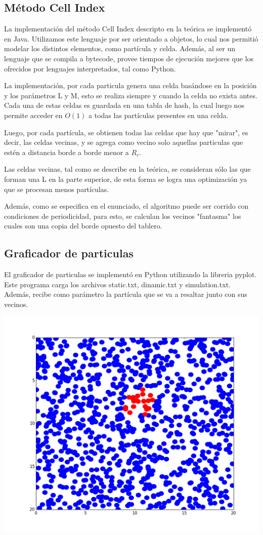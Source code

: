 \documentclass[a4paper]{article}
\begin{document}
\subsection{Método Cell Index}
La implementación del método Cell Index descripto en la teórica se implementó en Java. Utilizamos este lenguaje por ser orientado a objetos, lo cual nos permitió modelar los distintos elementos, como partícula y celda. Además, al ser un lenguaje que se compila a bytecode, provee tiempos de ejecución mejores que los ofrecidos por lenguajes interpretados, tal como Python.

La implementación, por cada particula genera una celda basándose en la posición y los parámetros L y M, esto se realiza siempre y cuando la celda no exista antes. Cada una de estas celdas es guardada en una tabla de hash, la cual luego nos permite acceder en $O(1)$ a todas las partículas presentes en una celda.

Luego, por cada partícula, se obtienen todas las celdas que hay que "mirar", es decir, las celdas vecinas, y se agrega como vecino solo aquellas particulas que estén a distancia borde a borde menor a $R_c$.

Las celdas vecinas, tal como se describe en la teórica, se consideran sólo las que forman una L en la parte superior, de esta forma se logra una optimización ya que se procesan menos partículas.

Además, como se especifica en el enunciado, el algoritmo puede ser corrido con condiciones de periodicidad, para esto, se calculan los vecinos "fantasma" los cuales son una copia del borde opuesto del tablero.

\newpage

\subsection{Graficador de particulas}
El graficador de particulas se implementó en Python utilizando la libreria pyplot. Este programa carga los archivos static.txt, dinamic.txt y simulation.txt. Además, recibe como parámetro la partícula que se va a resaltar junto con sus vecinos.
\begin{center}
  \includegraphics[width=0.75\linewidth]{figure_1.png}
\end{center}
\end{document}

